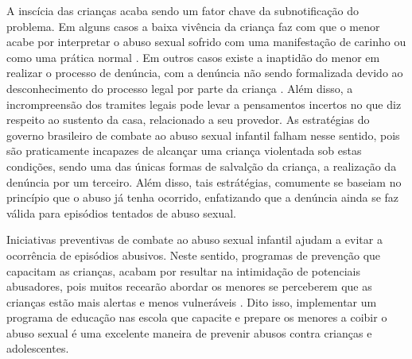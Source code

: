 A inscícia das crianças acaba sendo um fator chave da subnotificação do problema. Em alguns casos a baixa vivência da criança faz com que o menor acabe por interpretar o abuso sexual sofrido com uma manifestação de carinho ou como uma prática normal \cite{aded2006abuso}. Em outros casos existe a inaptidão do menor em realizar o processo de denúncia, com a denúncia não sendo formalizada devido ao desconhecimento do processo legal por parte da criança \cite{krug2002world}. Além disso, a incrompreensão dos tramites legais pode levar a pensamentos incertos no que diz respeito ao sustento da casa, relacionado a seu provedor. As estratégias do governo brasileiro de combate ao abuso sexual infantil falham nesse sentido, pois são praticamente incapazes de alcançar uma criança violentada sob estas condições, sendo uma das únicas formas de salvalção da criança, a realização da denúncia por um terceiro. Além disso, tais estrátégias, comumente se baseiam no princípio que o abuso já tenha ocorrido, enfatizando que a denúncia ainda se faz válida para episódios tentados de abuso sexual.


Iniciativas preventivas de combate ao abuso sexual infantil ajudam a evitar a ocorrência de episódios abusivos. Neste sentido, programas de prevenção que capacitam as crianças, acabam por resultar na intimidação de potenciais abusadores, pois muitos recearão abordar os menores se perceberem que as crianças estão mais alertas e menos vulneráveis \cite{maria2010papel}. Dito isso, implementar um programa de educação nas escola que capacite e prepare os menores a coibir o abuso sexual é uma excelente maneira de prevenir abusos contra crianças e adolescentes.%





